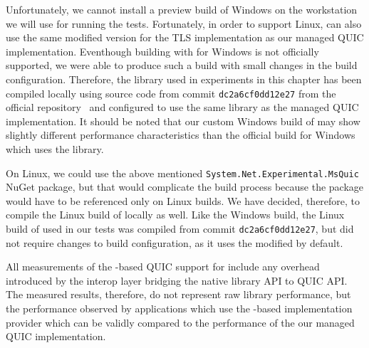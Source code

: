 Unfortunately, we cannot install a preview build of Windows on the workstation we will use for
running the tests. Fortunately, in order to support Linux, \libmsquic{} can also use the same
modified \libopenssl{} version for the TLS implementation as our managed QUIC implementation.
Eventhough building \libmsquic{} with \libopenssl{} for Windows is not officially supported, we were
able to produce such a build with small changes in the \libmsquic{} build configuration. Therefore,
the \libmsquic{} library used in experiments in this chapter has been compiled locally using source
code from commit \texttt{dc2a6cf0dd12e27} from the official \libmsquic{}
repository~\cite{msquicGithub} and configured to use the same \libopenssl{} library as the managed
QUIC implementation. It should be noted that our custom Windows build of \libmsquic{} may show
slightly different performance characteristics than the official build for Windows which uses the
\libschannel{} library.

On Linux, we could use the above mentioned
\texttt{System.Net\allowbreak{}.Experimental.\allowbreak{}MsQuic} NuGet package, but that would
complicate the build process because the package would have to be referenced only on Linux builds.
We have decided, therefore, to compile the Linux build of \libmsquic{} locally as well. Like the
Windows build, the Linux build of \libmsquic{} used in our tests was compiled from commit
\texttt{dc2a6cf0dd12e27}, but did not require changes to build configuration, as it uses the
modified \libopenssl{} by default.

All measurements of the \libmsquic{}-based QUIC support for \dotnet{} include any overhead
introduced by the interop layer bridging the native library API to \dotnet{} QUIC API\@. The
measured results, therefore, do not represent raw \libmsquic{} library performance, but the
performance observed by \dotnet{} applications which use the \libmsquic{}-based implementation
provider which can be validly compared to the performance of the our managed QUIC implementation.




